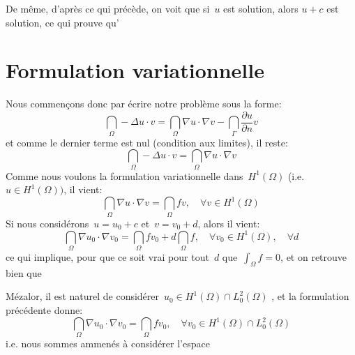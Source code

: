 De même, d'après ce qui précède, on voit que si~$u$ est solution, alors
$u+c$ est solution, ce qui prouve qu'

\medskip
\section{Formulation variationnelle}

\medskip
Nous commençons donc par écrire notre problème sous la forme:
\begin{equation}
\dint_\Omega -\Delta u\cdot v = \dint_\Omega \nabla u\cdot \nabla v - \dint_\Gamma \frac{\partial u}{\partial n} v
\end{equation}
et comme le dernier terme est nul (condition aux limites), il reste:
\begin{equation}
\dint_\Omega -\Delta u\cdot v = \dint_\Omega \nabla u\cdot \nabla v
\end{equation}
Comme nous voulons la formulation variationnelle dans~$H^1(\Omega)$ (i.e.~$u\in H^1(\Omega))$, il vient:
\begin{equation}
\dint_\Omega \nabla u\cdot \nabla v = \dint_\Omega f v, \quad \forall v\in H^1(\Omega)
\end{equation}
\medskip
Si nous considérons~$u=u_0+c$ et~$v=v_0+d$, alors il vient:
\begin{equation}
\dint_\Omega \nabla u_0\cdot\nabla v_0 = \dint_\Omega f v_0 + d\dint_\Omega f, \quad \forall v_0\in H^1(\Omega),\quad \forall d
\end{equation}
ce qui implique, pour que ce soit vrai pour tout~$d$ que~$\int_\Omega f=0$, et on retrouve
bien que 

\medskip
Mézalor, il est naturel de considérer~$u_0\in H^1(\Omega)\cap L^2_0(\Omega)$ , et
la formulation précédente donne:
\begin{equation}
\dint_\Omega \nabla u_0\cdot\nabla v_0 = \dint_\Omega f v_0,
\quad \forall v_0\in H^1(\Omega)\cap L^2_0(\Omega)
\end{equation}
i.e. nous sommes ammenés à considérer l'espace 


